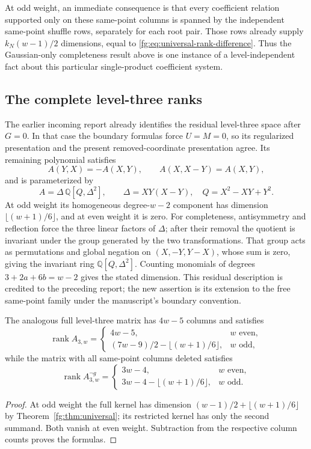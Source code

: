 At odd weight, an immediate consequence is that every coefficient
relation supported only on these same-point columns is spanned by
the independent same-point shuffle rows, separately for each root
pair. Those rows already supply $k_N(w-1)/2$ dimensions, equal to
\eqref{fg:eq:universal-rank-difference}. Thus the Gaussian-only
completeness result above is one instance of a level-independent
fact about this particular single-product coefficient system.

\subsection{The complete level-three ranks}

The earlier incoming report \cite{PriorResearch} already identifies the residual
level-three space after $G=0$. In that case the boundary formulas
force $U=M=0$, so its regularized presentation and the present
removed-coordinate presentation agree. Its remaining polynomial
satisfies
\[
 A(Y,X)=-A(X,Y),\qquad A(X,X-Y)=A(X,Y),
\]
and is parameterized by
\[
 A=\Delta\,\mathbb Q[Q,\Delta^2],\qquad
 \Delta=XY(X-Y),\quad Q=X^2-XY+Y^2.
\]
At odd weight its homogeneous degree-$w-2$ component has dimension
$\lfloor(w+1)/6\rfloor$, and at even weight it is zero.
For completeness, antisymmetry and reflection force the three
linear factors of $\Delta$; after their removal the quotient is
invariant under the group generated by the two transformations.
That group acts as permutations and global negation on
$(X,-Y,Y-X)$, whose sum is zero, giving the invariant ring
$\mathbb Q[Q,\Delta^2]$. Counting monomials of degrees
$3+2a+6b=w-2$ gives the stated dimension.
This residual description is credited to the preceding report; the
new assertion is its extension to the free same-point family under
the manuscript's boundary convention.

\begin{corollary}\label{fg:cor:level3}
The analogous full level-three matrix has $4w-5$ columns and satisfies
\[
 \operatorname{rank}A_{3,w}
 =\begin{cases}
    4w-5,&w\text{ even},\\
    (7w-9)/2-\lfloor(w+1)/6\rfloor,&w\text{ odd},
  \end{cases}
\]
while the matrix with all same-point columns deleted satisfies
\[
 \operatorname{rank}A_{3,w}^{\neg g}
 =\begin{cases}
    3w-4,&w\text{ even},\\
    3w-4-\lfloor(w+1)/6\rfloor,&w\text{ odd}.
  \end{cases}
\]
\end{corollary}
\begin{proof}
At odd weight the full kernel has dimension
$(w-1)/2+\lfloor(w+1)/6\rfloor$ by
Theorem~\ref{fg:thm:universal}; its restricted kernel has only the
second summand. Both vanish at even weight. Subtraction from the
respective column counts proves the formulas.
\end{proof}

